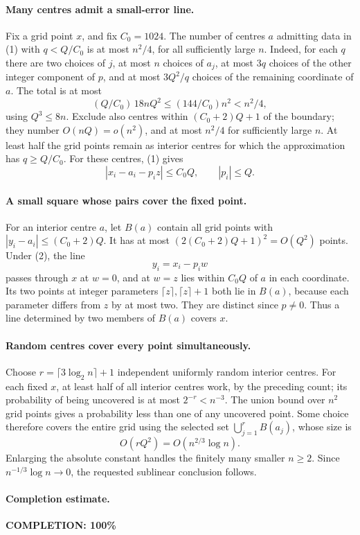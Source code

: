\paragraph{Many centres admit a small-error line.}
Fix a grid point \(x\), and fix \(C_0=1024\).
The number of centres \(a\) admitting data in (1) with
\(q<Q/C_0\) is at most \(n^2/4\), for all sufficiently large \(n\).
Indeed, for each \(q\) there are two choices of \(j\), at
most \(n\) choices of \(a_j\), at most \(3q\) choices of the
other integer component of \(p\), and at most
\(3Q^2/q\) choices of the remaining coordinate of \(a\).
The total is at most
\[
 (Q/C_0)\,18nQ^2
 \leq(144/C_0)n^2<n^2/4,
\]
using \(Q^3\leq8n\).
Exclude also centres within \((C_0+2)Q+1\) of the boundary;
they number \(O(nQ)=o(n^2)\), and at most \(n^2/4\) for
sufficiently large \(n\).
At least half the grid points remain as interior centres
for which the approximation has \(q\geq Q/C_0\).
For these centres, (1) gives
\[
 |x_i-a_i-p_i z|\leq C_0Q,\qquad |p_i|\leq Q.                  \tag{2}
\]

\paragraph{A small square whose pairs cover the fixed point.}
For an interior centre \(a\), let \(B(a)\) contain all grid
points with \(|y_i-a_i|\leq(C_0+2)Q\).
It has at most \((2(C_0+2)Q+1)^2=O(Q^2)\) points.
Under (2), the line
\[
 y_i=x_i-p_iw
\]
passes through \(x\) at \(w=0\), and at \(w=z\) lies within
\(C_0Q\) of \(a\) in each coordinate.
Its two points at integer parameters
\(\lceil z\rceil,\lceil z\rceil+1\) both lie in \(B(a)\),
because each parameter differs from \(z\) by at most two.
They are distinct since \(p\ne0\).
Thus a line determined by two members of \(B(a)\) covers \(x\).

\paragraph{Random centres cover every point simultaneously.}
Choose \(r=\lceil3\log_2 n\rceil+1\) independent uniformly
random interior centres.
For each fixed \(x\), at least half of all interior centres
work, by the preceding count; its probability of being
uncovered is at most \(2^{-r}<n^{-3}\).
The union bound over \(n^2\) grid points gives a probability
less than one of any uncovered point.
Some choice therefore covers the entire grid using the
selected set \(\bigcup_{j=1}^rB(a_j)\), whose size is
\[
 O(rQ^2)=O(n^{2/3}\log n).
\]
Enlarging the absolute constant handles the finitely many
smaller \(n\geq2\). Since \(n^{-1/3}\log n\to0\), the
requested sublinear conclusion follows.

\paragraph{Completion estimate.}
\textbf{COMPLETION: 100\%}
